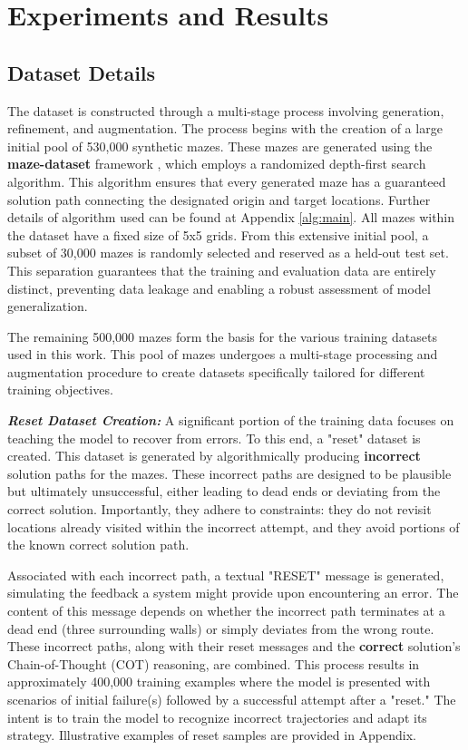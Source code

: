 \section{Experiments and Results}
\label{sec:experiments}

\subsection{Dataset Details}
\label{subsec:dataset_details}
The dataset is constructed through a multi-stage process involving generation, refinement, and augmentation. The process begins with the creation of a large initial pool of 530,000 synthetic mazes. These mazes are generated using the \textbf{maze-dataset} framework \cite{ivanitskiy2023configurablelibrarygeneratingmanipulating}, which employs a randomized depth-first search algorithm. This algorithm ensures that every generated maze has a guaranteed solution path connecting the designated origin and target locations. Further details of algorithm used can be found at Appendix \ref{alg:main}. All mazes within the dataset have a fixed size of 5x5 grids. From this extensive initial pool, a subset of 30,000 mazes is randomly selected and reserved as a held-out test set. This separation guarantees that the training and evaluation data are entirely distinct, preventing data leakage and enabling a robust assessment of model generalization.

The remaining 500,000 mazes form the basis for the various training datasets used in this work. This pool of mazes undergoes a multi-stage processing and augmentation procedure to create datasets specifically tailored for different training objectives.

\textit{\textbf{Reset Dataset Creation:}} A significant portion of the training data focuses on teaching the model to recover from errors. To this end, a "reset" dataset is created. This dataset is generated by algorithmically producing \textbf{incorrect} solution paths for the mazes. These incorrect paths are designed to be plausible but ultimately unsuccessful, either leading to dead ends or deviating from the correct solution. Importantly, they adhere to constraints: they do not revisit locations already visited within the incorrect attempt, and they avoid portions of the known correct solution path.

Associated with each incorrect path, a textual "RESET" message is generated, simulating the feedback a system might provide upon encountering an error.  The content of this message depends on whether the incorrect path terminates at a dead end (three surrounding walls) or simply deviates from the wrong route.  These incorrect paths, along with their reset messages and the \textbf{correct} solution's Chain-of-Thought (COT) reasoning, are combined.  This process results in approximately 400,000 training examples where the model is presented with scenarios of initial failure(s) followed by a successful attempt after a "reset."  The intent is to train the model to recognize incorrect trajectories and adapt its strategy. Illustrative examples of reset samples are provided in Appendix.



